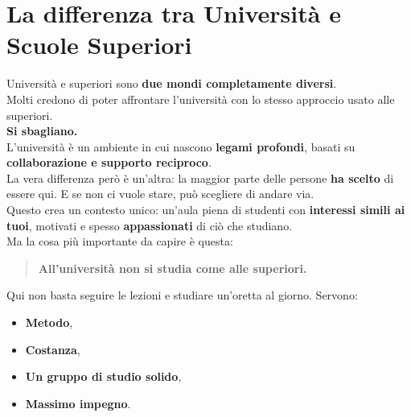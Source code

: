 \documentclass[18pt]{extarticle}
\begin{document}
\section{La differenza tra Università e Scuole Superiori}
Università e superiori sono \textbf{due mondi completamente diversi}.\\
Molti credono di poter affrontare l'università con lo stesso approccio usato alle superiori.\\
\textbf{Si sbagliano.}\\
L'università è un ambiente in cui nascono \textbf{legami profondi}, basati su \textbf{collaborazione e supporto reciproco}.\\
La vera differenza però è un'altra: la maggior parte delle persone \textbf{ha scelto} di essere qui. E se non ci vuole stare, può scegliere di andare via.\\
Questo crea un contesto unico: un'aula piena di studenti con \textbf{interessi simili ai tuoi}, motivati e spesso \textbf{appassionati} di ciò che studiano.\\
Ma la cosa più importante da capire è questa:
\begin{quote}
\textbf{All'università non si studia come alle superiori.}
\end{quote}%
Qui non basta seguire le lezioni e studiare un'oretta al giorno. Servono:
\begin{itemize}
\item \textbf{Metodo},
\item \textbf{Costanza},
\item \textbf{Un gruppo di studio solido},
\item \textbf{Massimo impegno}.
\end{itemize}
\end{document}
